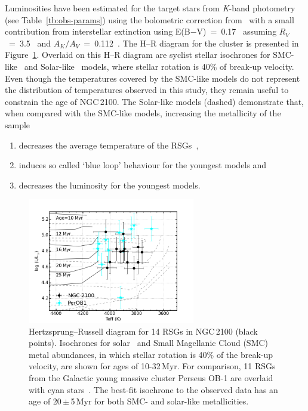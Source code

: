 Luminosities have been estimated for the target stars from {\it K}-band photometry (see Table~\ref{tb:obs-params}) using the bolometric correction from~\cite{2013ApJ...767....3D} with a small contribution from interstellar extinction using E(B$-$V)~=~0.17~\citep{2015A&A...575A..62N} assuming $R_V$~=~3.5~\citep{2013A&A...558A.134D} and $A_K/A_V$~=~0.112~\citep{1985ApJ...288..618R}.
The H--R diagram for the cluster is presented in Figure~\ref{fig:HRD}.
Overlaid on this H--R diagram are {\sc syclist} stellar isochrones for SMC-like~\citep[solid lines;][]{2013A&A...558A.103G} and Solar-like~\citep[dashed lines;][]{2012A&A...537A.146E} models, where stellar rotation is 40\% of break-up velocity.
Even though the temperatures covered by the SMC-like models do not represent the distribution of temperatures observed in this study, they remain useful to constrain the age of NGC\,2100.
The Solar-like models (dashed) demonstrate that, when compared with the SMC-like models, increasing the metallicity of the sample
\begin{enumerate}
\item decreases the average temperature of the RSGs~\citep[something which is not observed by][see Chapter~\ref{ch:ngc6822}]{2015ApJ...803...14P},
\item induces so called `blue loop' behaviour for the youngest models and
\item decreases the luminosity for the youngest models.
\end{enumerate}

\begin{figure}
\centering
 \includegraphics[width=0.65\textwidth]{ngc2100/NGC2100-HRD-perOB1}
 \caption[NGC\,2100 Hertzsprung--Russell diagram for RSGs]{Hertzsprung--Russell diagram for 14 RSGs in NGC\,2100 (black points).
  Isochrones for solar~\citep[dashed grey lines;][]{2012A&A...537A.146E} and Small Magellanic Cloud (SMC)~\citep[solid black lines;][]{2013A&A...558A.103G} metal abundances,
  in which stellar rotation is 40\% of the break-up velocity, are shown for ages of 10-32\,Myr. For comparison, 11 RSGs from the Galactic young massive cluster Perseus OB-1 are overlaid with cyan stars~\citep{2014ApJ...788...58G}.
  The best-fit isochrone to the observed data has an age of 20\,$\pm$\,5\,Myr for both SMC- and solar-like metallicities.
  \label{fig:HRD}
          }
\end{figure}


